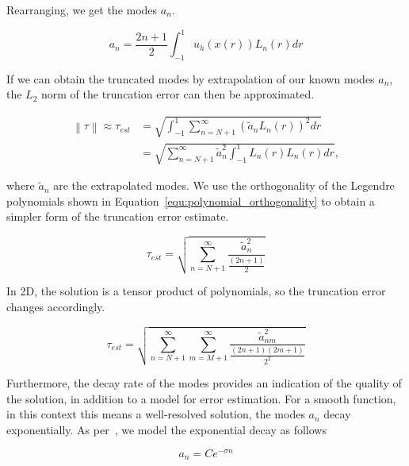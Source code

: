 \noindent
Rearranging, we get the modes \(a_n\).

\begin{equation} \label{equ:modes}
    a_n = \frac{2n + 1}{2}\int_{-1}^{1}u_h(x(r))L_n(r)dr
\end{equation}

\noindent
If we can obtain the truncated modes by extrapolation of our known modes \(a_n\), the \(L_2\) norm
of the truncation error can then be approximated.

\begin{equation} \label{equ:error_norm}
    \begin{aligned}
        \left \| \tau \right \| \approx \tau_{est} &= \sqrt{\int_{-1}^{1} \sum_{n = N + 1}^{\infty } {\left( \widetilde{a}_n L_n(r) \right)}^2 dr} \\
        &= \sqrt{\sum_{n = N + 1}^{\infty }\widetilde{a}_n^2 \int_{-1}^{1} L_n(r) L_n(r) dr},
    \end{aligned}
\end{equation}

\noindent
where \(\widetilde{a}_n\) are the extrapolated modes. We use the orthogonality of the Legendre
polynomials shown in Equation~\ref{equ:polynomial_orthogonality} to obtain a simpler form of the
truncation error estimate.

\begin{equation} \label{equ:error_norm_1D}
    \tau_{est} = \sqrt{\sum_{n = N + 1}^{\infty } \frac{\widetilde{a}_{n}^2}{\frac{(2n + 1)}{2}}}
\end{equation}

\noindent
In 2D, the solution is a tensor product of polynomials, so the truncation error changes accordingly. 

\begin{equation} \label{equ:error_norm_2D}
    \tau_{est} = \sqrt{\sum_{n = N + 1}^{\infty } \sum_{m = M + 1}^{\infty}\frac{\widetilde{a}_{nm}^2}{\frac{(2n + 1)(2m + 1)}{2^2}}}
\end{equation}

Furthermore, the decay rate of the modes provides an indication of the quality of the solution, in
addition to a model for error estimation. For a smooth function, in this context this means a
well-resolved solution, the modes \(a_n\) decay exponentially. As per~\cite{Mavriplis1990}, we model
the exponential decay as follows

\begin{equation} \label{equ:exponential_decay}
    a_n = Ce^{-\sigma n}
\end{equation}

